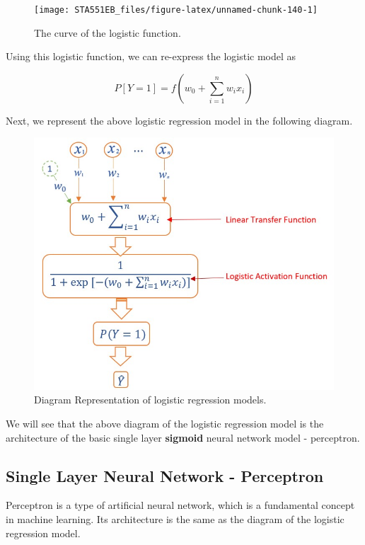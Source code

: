 \documentclass[
]{book}
\begin{document}
\begin{figure}

{\centering \texttt{[image: STA551EB\_files/figure-latex/unnamed-chunk-140-1]} 

}

\caption{The curve of the logistic function.}\label{fig:unnamed-chunk-140}
\end{figure}

Using this logistic function, we can re-express the logistic model as

\[
P[Y = 1] = f\left(w_0+\sum_{i=1}^n w_ix_i\right)
\]

Next, we represent the above logistic regression model in the following diagram.

\begin{figure}

{\centering \includegraphics[width=0.7\linewidth]{img07/w07-logisticDiagram} 

}

\caption{Diagram Representation of logistic regression models.}\label{fig:unnamed-chunk-141}
\end{figure}

We will see that the above diagram of the logistic regression model is the architecture of the basic single layer \textbf{sigmoid} neural network model - perceptron.

\hypertarget{single-layer-neural-network---perceptron}{%
\subsection{Single Layer Neural Network - Perceptron}\label{single-layer-neural-network---perceptron}}

Perceptron is a type of artificial neural network, which is a fundamental concept in machine learning. Its architecture is the same as the diagram of the logistic regression model.
\end{document}
